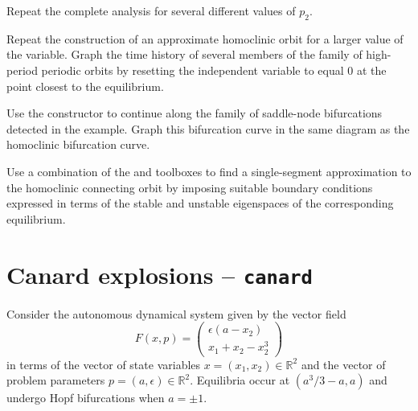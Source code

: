 \begin{exercises}

\item Repeat the complete analysis for several different values of $p_2$. 

\item Repeat the construction of an approximate homoclinic orbit for a larger value of the  variable. Graph the time history of several members of the family of high-period periodic orbits by resetting the independent variable to equal $0$ at the point closest to the equilibrium.

\item Use the  constructor to continue along the family of saddle-node bifurcations detected in the example. Graph this bifurcation curve in the same diagram as the homoclinic bifurcation curve.

\item Use a combination of the  and  toolboxes to find a single-segment approximation to the homoclinic connecting orbit by imposing suitable boundary conditions expressed in terms of the stable and unstable eigenspaces of the corresponding equilibrium.

\end{exercises}

\section{Canard explosions -- \texttt{canard}}
Consider the autonomous dynamical system given by the vector field
\begin{equation}
F(x,p)=\left(\begin{array}{c}\epsilon(a-x_2)\\ x_1+x_2-x_2^3\end{array}\right)
\end{equation}
in terms of the vector of state variables $x=(x_1,x_2)\in\mathbb{R}^2$ and the vector of problem parameters $p=(a,\epsilon)\in\mathbb{R}^2$. Equilibria occur at $(a^3/3-a,a)$ and undergo Hopf bifurcations when $a=\pm 1$.

